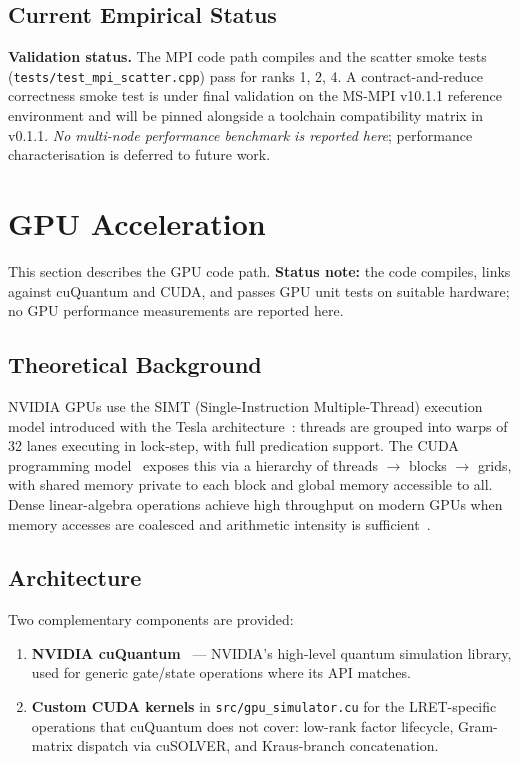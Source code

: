 \documentclass[11pt,a4paper]{article}
\begin{document}
\subsection{Current Empirical Status}

\begin{infobox}
\textbf{Validation status.} The MPI code path compiles and the scatter smoke tests
(\texttt{tests/test\_mpi\_scatter.cpp}) pass for ranks 1, 2, 4. A
contract-and-reduce correctness smoke test is under final validation on the
MS-MPI v10.1.1 reference environment and will be pinned alongside a toolchain
compatibility matrix in v0.1.1. \emph{No multi-node performance benchmark is
reported here}; performance characterisation is deferred to future work.
\end{infobox}

\section{GPU Acceleration}
\label{sec:gpu}

This section describes the GPU code path. \textbf{Status note:} the code compiles,
links against cuQuantum and CUDA, and passes GPU unit tests on suitable hardware;
no GPU performance measurements are reported here.

\subsection{Theoretical Background}

NVIDIA GPUs use the SIMT (Single-Instruction Multiple-Thread) execution model
introduced with the Tesla architecture~\cite{lindholm2008tesla}: threads are grouped
into warps of 32 lanes executing in lock-step, with full predication support.
The CUDA programming model~\cite{nickolls2008cuda} exposes this via a hierarchy of
threads $\to$ blocks $\to$ grids, with shared memory private to each block and global
memory accessible to all. Dense linear-algebra operations achieve high throughput on
modern GPUs when memory accesses are coalesced and arithmetic intensity is
sufficient~\cite{volkovdemmel2008}.

\subsection{Architecture}

Two complementary components are provided:
\begin{enumerate}
  \item \textbf{NVIDIA cuQuantum}~\cite{bayraktar2023cuquantum} --- NVIDIA's high-level
        quantum simulation library, used for generic gate/state operations where its
        API matches.
  \item \textbf{Custom CUDA kernels} in \texttt{src/gpu\_simulator.cu} for the
        LRET-specific operations that cuQuantum does not cover: low-rank factor
        lifecycle, Gram-matrix dispatch via cuSOLVER, and Kraus-branch concatenation.
\end{enumerate}
\end{document}
